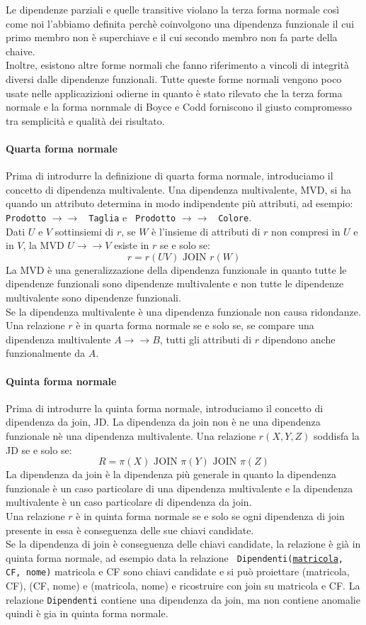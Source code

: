 \documentclass[12pt]{report}
\begin{document}
	Le dipendenze parziali e quelle transitive violano la terza forma normale così come noi l'abbiamo definita perchè coinvolgono una dipendenza funzionale il cui primo membro non è superchiave e il cui secondo membro non fa parte della chaive. \\
	Inoltre, esistono altre forme normali che fanno riferimento a vincoli di integrità diversi dalle dipendenze funzionali. Tutte queste forme normali vengono poco usate nelle applicazizioni odierne in quanto è stato rilevato che la terza forma normale e la forma nornmale di Boyce e Codd forniscono il giusto compromesso tra semplicità e qualità dei risultato.
	\paragraph{Quarta forma normale} Prima di introdurre la definizione di quarta forma normale, introduciamo il concetto di dipendenza multivalente. Una dipendenza multivalente, MVD, si ha quando un attributo determina in modo indipendente più attributi, ad esempio: \texttt{ Prodotto} $\to\to$ \texttt{ Taglia} e \texttt{ Prodotto} $\to\to$ \texttt{ Colore}. \\
	Dati $U$ e $V$ sottinsiemi di $r$, se $W$ è l'insieme di attributi di $r$ non compresi in $U$ e in $V$, la MVD $U \to\to V$ esiste in $r$ se e solo se:
	\[
	r = r\left(UV\right) \text{ JOIN } r\left(W\right)
	\]
	La MVD è una generalizzazione della dipendenza funzionale in quanto tutte le dipendenze funzionali sono dipendenze multivalente e non tutte le dipendenze multivalente sono dipendenze funzionali. \\
	Se la dipendenza multivalente è una dipendenza funzionale non causa ridondanze.  \\
	Una relazione $r$ è in quarta forma normale se e solo se, se compare una dipendenza multivalente $A \to\to B$, tutti gli attributi di $r$ dipendono anche funzionalmente da $A$.
	\paragraph{Quinta forma normale} Prima di introdurre la quinta forma normale, introduciamo il concetto di dipendenza da join, JD. La dipendenza da join non è ne una dipendenza funzionale nè una dipendenza multivalente. Una relazione $r(X, Y, Z)$ soddisfa la JD se e solo se:
	\[
	R = \pi\left(X\right) \text{ JOIN } \pi\left(Y\right) \text{ JOIN } \pi\left(Z\right)
	\]
	La dipendenza da join è la dipendenza più generale in quanto la dipendenza funzionale è un caso particolare di una dipendenza multivalente e la dipendenza multivalente è un caso particolare di dipendenza da join. \\
	Una relazione $r$ è in quinta forma normale se e solo se ogni dipendenza di join presente in essa è conseguenza delle sue chiavi candidate. \\
	Se la dipendenza di join è conseguenza delle chiavi candidate, la relazione è già in quinta forma normale, ad esempio data la relazione \texttt{ Dipendenti(\underline{matricola}, CF, nome)} matricola e CF sono chiavi candidate e si può proiettare (matricola, CF), (CF, nome) e (matricola, nome) e ricostruire con join su matricola e CF. La relazione \texttt{Dipendenti} contiene una dipendenza da join, ma non contiene anomalie quindi è gia in quinta forma normale.
\end{document}
